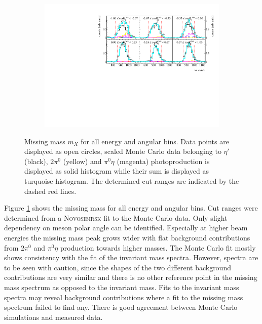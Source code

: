 \begin{figure}[H]
	\ContinuedFloat
	\begin{subfigure}{\linewidth}
		\includegraphics[width=\linewidth]{../figs/hydrogen/bin_cuts/mismcut_ebin3.pdf}
	\end{subfigure}
	\caption{Missing mass $m_X$ for all energy and angular bins. Data points are displayed as open circles, scaled Monte Carlo data belonging to  $\eta'$ (black), $2\pi^0$ (yellow) and $\pi^0\eta$ (magenta) photoproduction is displayed as solid histogram while their sum is displayed as turquoise histogram. The determined cut ranges are indicated by the dashed red lines.}
	\label{fig:appmism}
\end{figure}
Figure \ref{fig:appmism} shows the missing mass for all energy and angular bins. Cut ranges were determined from a \textsc{Novosibirsk} fit to the Monte Carlo data. Only slight dependency on meson polar angle can be identified. Especially at higher beam energies the missing mass peak grows wider with flat background contributions from $2\pi^0$ and $\pi^0\eta$ production towards higher masses. The Monte Carlo fit mostly shows consistency with the fit of the invariant mass spectra. However, spectra are to be seen with caution, since the shapes of the two different background contributions are very similar and there is no other reference point in the missing mass spectrum as opposed to the invariant mass. Fits to the invariant mass spectra may reveal background contributions where a fit to the missing mass spectrum failed to find any. There is good agreement between Monte Carlo simulations and measured data.
\newpage
